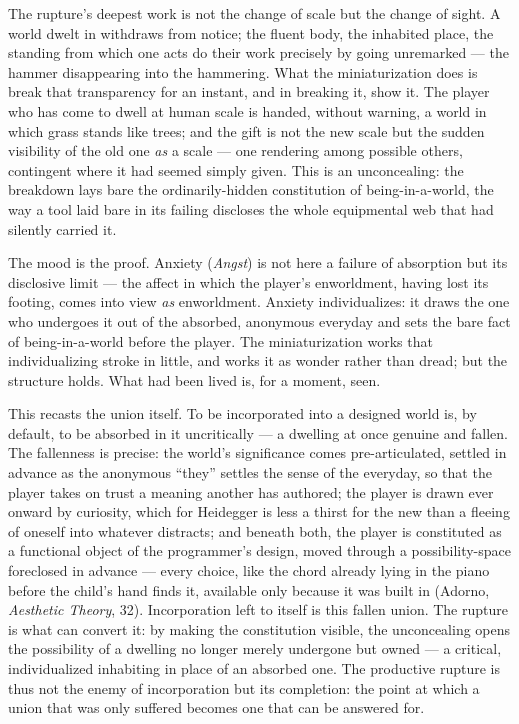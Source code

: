 \documentclass{article}
\begin{document}
The rupture's deepest work is not the change of scale but the change of sight. A world dwelt in withdraws from notice; the fluent body, the inhabited place, the standing from which one acts do their work precisely by going unremarked — the hammer disappearing into the hammering. What the miniaturization does is break that transparency for an instant, and in breaking it, show it. The player who has come to dwell at human scale is handed, without warning, a world in which grass stands like trees; and the gift is not the new scale but the sudden visibility of the old one \textit{as} a scale — one rendering among possible others, contingent where it had seemed simply given. This is an unconcealing: the breakdown lays bare the ordinarily-hidden constitution of being-in-a-world, the way a tool laid bare in its failing discloses the whole equipmental web that had silently carried it.

The mood is the proof. Anxiety (\textit{Angst}) is not here a failure of absorption but its disclosive limit — the affect in which the player's enworldment, having lost its footing, comes into view \textit{as} enworldment. Anxiety individualizes: it draws the one who undergoes it out of the absorbed, anonymous everyday and sets the bare fact of being-in-a-world before the player. The miniaturization works that individualizing stroke in little, and works it as wonder rather than dread; but the structure holds. What had been lived is, for a moment, seen.

This recasts the union itself. To be incorporated into a designed world is, by default, to be absorbed in it uncritically — a dwelling at once genuine and fallen. The fallenness is precise: the world's significance comes pre-articulated, settled in advance as the anonymous ``they'' settles the sense of the everyday, so that the player takes on trust a meaning another has authored; the player is drawn ever onward by curiosity, which for Heidegger is less a thirst for the new than a fleeing of oneself into whatever distracts; and beneath both, the player is constituted as a functional object of the programmer's design, moved through a possibility-space foreclosed in advance — every choice, like the chord already lying in the piano before the child's hand finds it, available only because it was built in (Adorno, \textit{Aesthetic Theory}, 32). Incorporation left to itself is this fallen union. The rupture is what can convert it: by making the constitution visible, the unconcealing opens the possibility of a dwelling no longer merely undergone but owned — a critical, individualized inhabiting in place of an absorbed one. The productive rupture is thus not the enemy of incorporation but its completion: the point at which a union that was only suffered becomes one that can be answered for.
\end{document}
